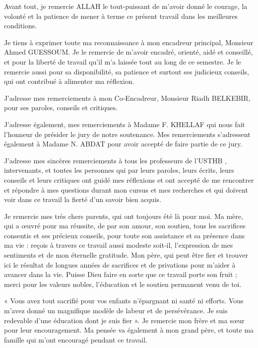 
\vspace{1.5cm}

\setlength{\parindent}{0.5cm}
Avant tout, je remercie ALLAH le tout-puissant de m'avoir donné le courage, la volonté et la patience de mener à terme ce présent travail dans les meilleures conditions.

Je tiens à exprimer toute ma reconnaissance à mon encadreur principal, Monsieur Ahmed GUESSOUM. Je le remercie de m’avoir encadré, orienté, aidé et conseillé, et pour la liberté de travail qu'il m'a laissée tout au long de ce semestre. 
Je le remercie aussi pour sa disponibilité, sa patience et surtout ses judicieux conseils, qui ont contribué à alimenter ma réflexion.

J’adresse mes remerciements à mon Co-Encadreur, Monsieur Riadh BELKEBIR, pour ses paroles, conseils et critiques.

J'adresse également, mes remerciements à Madame F. KHELLAF qui nous fait l'honneur de présider le jury de notre soutenance. Mes remerciements s’adressent également à Madame N. ABDAT pour avoir accepté de faire partie de ce jury.

J’adresse mes sincères remerciements à tous les professeurs de l'USTHB , intervenants, et toutes les personnes qui par leurs paroles, leurs écrits, leurs conseils et leurs critiques ont guidé mes réflexions et ont accepté de me rencontrer et répondre à mes questions durant mon cursus et mes recherches et qui doivent voir dans ce travail la fierté d'un savoir bien acquis.

Je remercie mes très chers parents, qui ont toujours été là pour moi. Ma mère, qui a œuvré pour ma réussite, de par son amour, son soutien, tous les sacrifices consentis et ses précieux conseils, pour toute son assistance et sa présence dans ma vie : reçois à travers ce travail aussi modeste soit-il, l'expression de mes sentiments et de mon éternelle gratitude. Mon père, qui peut être fier et trouver ici le résultat de longues années de sacrifices et de privations pour m'aider à avancer dans la vie. Puisse Dieu faire en sorte que ce travail porte son fruit ; merci pour les valeurs nobles, l'éducation et le soutien permanent venu de toi.

« Vous avez tout sacrifié pour vos enfants n’épargnant ni santé ni efforts. Vous m’avez donné un magnifique modèle de labeur et de persévérance. Je suis redevable d’une éducation dont je suis fier ».
Je remercie mon frère et ma sœur pour leur encouragement. Ma pensée va également à mon grand père, et toute ma famille qui m'ont encouragé pendant ce travail.

